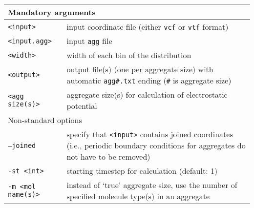 \noindent
\begin{longtable}{p{}p{}}
  \toprule
  \multicolumn{2}{l}{Mandatory arguments} \\
  \midrule
  \texttt{<input>} & input coordinate file (either \texttt{vcf} or
    \texttt{vtf} format) \\
  \texttt{<input.agg>} & input \texttt{agg} file \\
  \texttt{<width>} & width of each bin of the distribution \\
  \texttt{<output>} & output file(s) (one per aggregate size) with
    automatic \texttt{agg\#.txt} ending (\texttt{\#} is aggregate size) \\
  \texttt{<agg size(s)>} & aggregate size(s) for calculation of
  electrostatic potential \\
  \toprule
  \multicolumn{2}{l}{Non-standard options} \\
  \midrule
  \texttt{--joined} & specify that \texttt{<input>} contains joined
    coordinates (i.e., periodic boundary conditions for aggregates do not
    have to be removed) \\
  \texttt{-st <int>} & starting timestep for calculation (default: 1) \\
  \texttt{-m <mol name(s)>} & instead of `true' aggregate size, use the number
    of specified molecule type(s) in an aggregate \\
  \bottomrule
\end{longtable}
